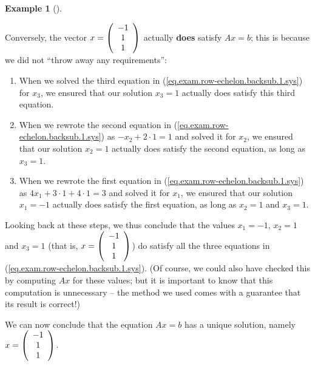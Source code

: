 \documentclass[numbers=enddot,12pt,final,onecolumn,notitlepage]{scrartcl}%
\theoremstyle{definition}
\newtheorem{exam}[theo]{Example}
\newenvironment{example}[1][]
{\begin{exam}[#1]\begin{leftbar}}
{\end{leftbar}\end{exam}}
\begin{document}
\begin{example}
Conversely, the vector $x=\left(
\begin{array}
[c]{c}%
-1\\
1\\
1
\end{array}
\right)  $ actually \textbf{does} satisfy $Ax=b$; this is because we did not
\textquotedblleft throw away any requirements\textquotedblright:

\begin{enumerate}
\item When we solved the third equation in
(\ref{eq.exam.row-echelon.backsub.1.sys}) for $x_{3}$, we ensured that our
solution $x_{3}=1$ actually does satisfy this third equation.

\item When we rewrote the second equation in
(\ref{eq.exam.row-echelon.backsub.1.sys}) as $-x_{2}+2\cdot1=1$ and solved it
for $x_{2}$, we ensured that our solution $x_{2}=1$ actually does satisfy the
second equation, as long as $x_{3}=1$.

\item When we rewrote the first equation in
(\ref{eq.exam.row-echelon.backsub.1.sys}) as $4x_{1}+3\cdot1+4\cdot1=3$ and
solved it for $x_{1}$, we ensured that our solution $x_{1}=-1$ actually does
satisfy the first equation, as long as $x_{2}=1$ and $x_{3}=1$.
\end{enumerate}

Looking back at these steps, we thus conclude that the values $x_{1}=-1$,
$x_{2}=1$ and $x_{3}=1$ (that is, $x=\left(
\begin{array}
[c]{c}%
-1\\
1\\
1
\end{array}
\right)  $) do satisfy all the three equations in
(\ref{eq.exam.row-echelon.backsub.1.sys}). (Of course, we could also have
checked this by computing $Ax$ for these values; but it is important to know
that this computation is unnecessary -- the method we used comes with a
guarantee that its result is correct!)

We can now conclude that the equation $Ax=b$ has a unique solution, namely
$x=\left(
\begin{array}
[c]{c}%
-1\\
1\\
1
\end{array}
\right)  $.
\end{example}
\end{document}

